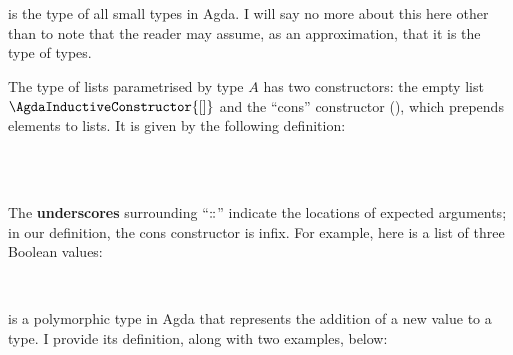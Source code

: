 \documentclass[12pt,a4paper,twoside,openright]{report}
\newcommand{\C}{\AgdaInductiveConstructor}
\newcommand{\F}{\AgdaFunction}
\begin{document}
\begin{code}
\>  \AgdaSymbol{:}  \<%
\\
\>[0]\<[2]%
\>[2] \AgdaSymbol{:} \<%
\\
\>[0]\<[2]%
\>[2] \AgdaSymbol{:} \<%
\end{code}
\F{Set} is the type of all small types in Agda. I will say no more about this here other than to note that the reader may assume, as an approximation, that it is the type of types.

The type of lists parametrised by type $A$ has two constructors: the empty list $\C{[]}$ and the ``cons'' constructor (\C{$\_\!\!\dblcolon\!\!\_$}), which prepends elements to lists. It is given by the following definition:

\begin{code}
\>  \AgdaSymbol{(} \AgdaSymbol{:} \AgdaSymbol{)} \AgdaSymbol{:}  \<%
\\
\>[0]\<[2]%
\>[2]\AgdaInductiveConstructor{[]} \AgdaSymbol{:}  \<%
\\
\>[0]\<[2]%
\>[2] \AgdaSymbol{:}       \<%
\end{code}
The {\bf underscores} surrounding ``$\dblcolon$'' indicate the locations of expected arguments; in our definition, the cons constructor is infix.  
For example, here is a list of three Boolean values:

\begin{code}
\> \AgdaSymbol{:}  \<%
\\
\> \AgdaSymbol{=}       \AgdaInductiveConstructor{[]}\<%
\end{code}
\F{Maybe} is a polymorphic type in Agda that represents the addition of a new value to a type. I provide its definition, along with two examples, below:
\end{document}
